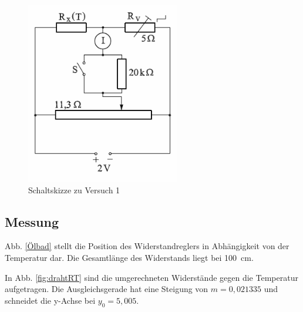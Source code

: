 \documentclass[11pt,a4paper,titlepage, ngerman]{article}
\begin{document}
			\begin{figure}
				\centering
				\includegraphics[width=0.6\textwidth]{Versuch2.png}
				\caption{Schaltskizze zu Versuch 1}
				\label{Schaltskizze2}
			\end{figure}
		
		\subsection{Messung}
			
			Abb. \ref{Ölbad} stellt die Position des Widerstandreglers in Abhängigkeit von der Temperatur dar.
			Die Gesamtlänge des Widerstands liegt bei \SI{100}{cm}.
			
			In Abb. \ref{fig:drahtRT} sind die umgerechneten Widerstände gegen die Temperatur aufgetragen.
			Die Ausgleichsgerade hat eine Steigung von $m = 0,021335$ und schneidet die y-Achse bei $y_0 = 5,005$.
			
\end{document}
